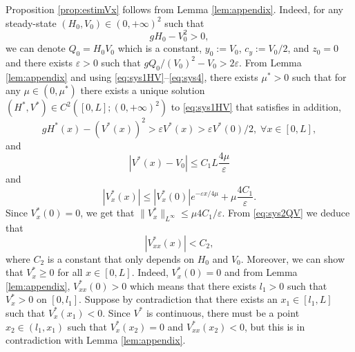 \documentclass[11pt]{article}
\begin{document}
Proposition \ref{prop:estimVx} follows from Lemma \ref{lem:appendix}. Indeed, for any steady-state $(H_{0},V_{0})\in (0,+\infty)^{2}$ such that
\begin{equation}
gH_{0}-V^{2}_{0}>0,
\end{equation}
we can denote $Q_{0} = H_{0}V_{0}$ which is a constant, $y_{0}:=V_{0}$, $c_{y}:=V_{0}/2$, and $z_{0} = 0$ and there exists $\varepsilon>0$ such that $gQ_{0}/(V_{0})^{2}-V_{0}>2\varepsilon$. From Lemma \ref{lem:appendix} and using \eqref{eq:sys1HV}--\eqref{eq:sys4}, there exists $\mu^{*}>0$ such that for any $\mu\in(0,\mu^{*})$ there exists a unique solution $(H^{*},V^{*})\in C^{2}([0,L];(0,+\infty)^{2})$ 
to \eqref{eq:sys1HV} that satisfies in addition,
\begin{equation}
    gH^{*}(x)-(V^{*}(x))^{2}>\varepsilon V^{*}(x)>\varepsilon V^{*}(0)/2,\;\forall x\in[0,L],
\end{equation}
and 
{
\begin{equation}
|V^{*}(x)-V_{0}|\leq C_{1}L\frac{4\mu}{\varepsilon}
\end{equation}
and}
\begin{equation}
\label{eq:vx_bounded}
    |V_{x}^{*}(x)|\leq 
    |V_{x}^{*}(0)|e^{-\varepsilon x/4\mu} +
    \mu \frac{4 C_{1}}{\varepsilon}.
\end{equation}
Since 
$V_{x}^{*}(0)=0$, we get that $\|V_{x}^{*}\|_{L^{\infty}}\leq \mu 4 C_{1}/\varepsilon$. From \eqref{eq:sys2QV} we deduce that
\begin{equation}
|V_{xx}^{*}(x)|< C_{2},
\end{equation}
where $C_{2}$ is a constant that only depends on $H_{0}$ and $V_{0}$. 
{Moreover, we can show that $V_{x}^{*} \geq 0$ for all $x \in [0,L]$. Indeed, $V_{x}^{*}(0)=0$ and from Lemma \ref{lem:appendix}, $V_{xx}^{*}(0)>0$ which means that there exists $l_{1}>0$ such that $V_{x}^{*}>0$ on $[0,l_{1}]$. Suppose by contradiction that there exists an $x_1 \in [l_{1},L]$ such that $V_{x}^{*}(x_1) < 0$. Since $V^{*}$ is continuous, there must be a point $x_2 \in (l_{1}, x_1)$ such that $V_{x}^{*}(x_2) = 0$ and $V_{xx}^{*}(x_{2}) < 0$, but this is in contradiction with Lemma \ref{lem:appendix}.}
\end{document}
